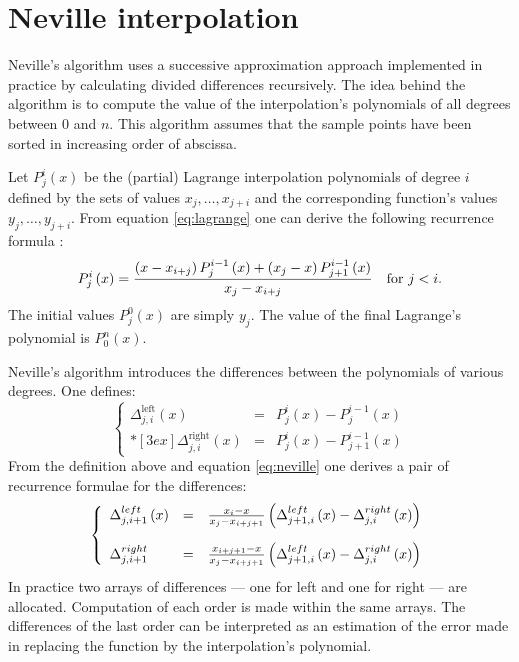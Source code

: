 \section{Neville interpolation}
\label{sec:neville} Neville's algorithm uses a successive
approximation approach implemented in practice by calculating
divided differences recursively. The idea behind the algorithm is
to compute the value of the interpolation's polynomials of all
degrees between 0 and $n$. This algorithm assumes that the sample
points have been sorted in increasing order of abscissa.

Let $P^i_j\left(x\right)$ be the (partial) Lagrange interpolation
polynomials of degree $i$ defined by the sets of values
$x_j,\ldots,x_{j+i}$ and the corresponding function's values
$y_j,\ldots,y_{j+i}$. From equation \ref{eq:lagrange} one can
derive the following recurrence formula \cite{Press}:
\begin{equation}
\label{eq:neville}
P^i_j\left(x\right)={\left(x-x_{i+j}\right)P^{i-1}_j\left(x\right)
+\left(x_j-x\right)P^{i-1}_{j+1}\left(x\right)\over x_j-x_{i+j}}
\mbox{\quad for $j<i$}.
\end{equation}
The initial values $P^0_j\left(x\right)$ are simply $y_j$. The
value of the final Lagrange's polynomial is $P^n_0\left(x\right)$.

Neville's algorithm introduces the differences between the
polynomials of various degrees. One defines:
\begin{equation}
\left\{ \begin{array}{lcl} \Delta_{j,i}^{\mathop
{left}}\left(x\right)
&=&P^i_j\left(x\right)-P^{i-1}_j\left(x\right)
\\*[3 ex] \Delta_{j,i}^{\mathop{right}}\left(x\right) &=&P^i_j\left(x\right)-P^{i-1}_{j+1}\left(x\right)
\end{array}\right.
\end{equation}
From the definition above and equation \ref{eq:neville} one
derives a pair of recurrence formulae for the differences:
\begin{equation}
\left\{ \begin{array}{lcl}\Delta_{j,i+1}^{\mathop
{left}}\left(x\right) &=&{x_i-x\over
x_j-x_{i+j+1}}\left(\Delta_{j+1,i}^{\mathop
{left}}\left(x\right)-\Delta_{j,i}^{\mathop
{right}}\left(x\right)\right)
\\*[3 ex] \Delta_{j,i+1}^{\mathop{right}} &=&{x_{i+j+1}-x\over
x_j-x_{i+j+1}}\left(\Delta_{j+1,i}^{\mathop
{left}}\left(x\right)-\Delta_{j,i}^{\mathop
{right}}\left(x\right)\right)
\end{array}\right.
\end{equation}
In practice two arrays of differences --- one for left and one for
right --- are allocated. Computation of each order is made within
the same arrays. The differences of the last order can be
interpreted as an estimation of the error made in replacing the
function by the interpolation's polynomial.


